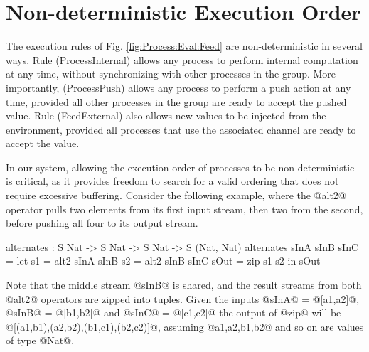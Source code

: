 \section{Non-deterministic Execution Order}
\label{s:EvaluationOrder}
%
%
%
%
%
%

The execution rules of Fig. \ref{fig:Process:Eval:Feed} are non-deterministic in several ways. Rule (ProcessInternal) allows any process to perform internal computation at any time, without synchronizing with other processes in the group. More importantly, (ProcessPush) allows any process to perform a push action at any time, provided all other processes in the group are ready to accept the pushed value. Rule (FeedExternal) also allows new values to be injected from the environment, provided all processes that use the associated channel are ready to accept the value.

In our system, allowing the execution order of processes to be non-deterministic is critical, as it provides freedom to search for a valid ordering that does not require excessive buffering. Consider the following example, where the @alt2@ operator pulls two elements from its first input stream, then two from the second, before pushing all four to its output stream.
\begin{code}
  alternates : S Nat -> S Nat -> S Nat -> S (Nat, Nat)
  alternates sInA sInB sInC
   = let  s1   = alt2 sInA sInB
          s2   = alt2 sInB sInC
          sOut = zip s1 s2
     in   sOut
\end{code}

Note that the middle stream @sInB@ is shared, and the result streams from both @alt2@ operators are zipped into tuples. Given the inputs @sInA@ = @[a1,a2]@, @sInB@ = @[b1,b2]@ and @sInC@ = @[c1,c2]@ the output of @zip@ will be @[(a1,b1),(a2,b2),(b1,c1),(b2,c2)]@, assuming @a1,a2,b1,b2@ and so on are values of type @Nat@.

